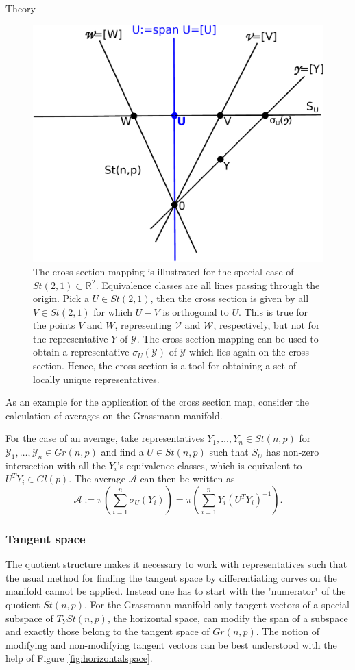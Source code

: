 \begin{chapter}{Theory}
\begin{figure}[h!]
        \centering
	    \includegraphics[width=0.5\linewidth]{./figures/theory/affinecrosssection.pdf}
	\caption[Affine cross section map]{ The cross section mapping is illustrated for the special
	case of $St(2,1)\subset\mathbb{R}^2$. Equivalence classes are all lines passing through the origin.
	Pick a $U\in St(2,1)$, then the cross section is given by all $V\in St(2,1)$ for which $U-V$ is
	orthogonal to $U$. This is true for the points $V$ and $W$, representing $\mathcal{V}$ and $\mathcal{W}$,
	respectively, but not for the representative $Y$ of $\mathcal{Y}$. 
	The cross section mapping can be used to obtain a representative $\sigma_U(\mathcal{Y})$ of $\mathcal{Y}$
	which lies again on the cross section. Hence, the cross section is a tool for obtaining a set 
	of locally unique representatives.	
	}
	\label{fig:crosssection}
\end{figure}
As an example for the application of the cross section map, consider the calculation of averages on the
Grassmann manifold. 
\begin{example}[Average]
For the case of an average, take representatives $Y_1,\ldots,Y_n\in St(n,p)$ for $\mathcal{Y}_1,\ldots,\mathcal{Y}_n\in Gr(n,p)$
and find a $U\in St(n,p)$ such that $S_U$ has non-zero intersection with all the $Y_i$'s equivalence classes, which is equivalent
to $U^TY_i\in Gl(p)$. The average $\mathcal{A}$ can then be written as
\begin{equation}
    \mathcal{A} := \pi\left(\sum_{i=1}^{n}\sigma_U(Y_i)\right)=\pi\left(\sum_{i=1}^{n}Y_i(U^{T}Y_i)^{-1}\right).
\end{equation}
\end{example}

\subsubsection{Tangent space} %
\label{ssub:Tangent space}
The quotient structure makes it necessary to work with representatives such that the usual method for finding the tangent space by differentiating
curves on the manifold cannot be applied. 
Instead one has to start with the "numerator" of the quotient $St(n,p)$. For the Grassmann manifold only tangent vectors of a special subspace of $T_YSt(n,p)$,
the horizontal space, can modify the span of a subspace and exactly those belong to the tangent space of $Gr(n,p)$. 
The notion of modifying and non-modifying tangent vectors can be best understood with the help of Figure \ref{fig:horizontalspace}.\\


\end{chapter}
